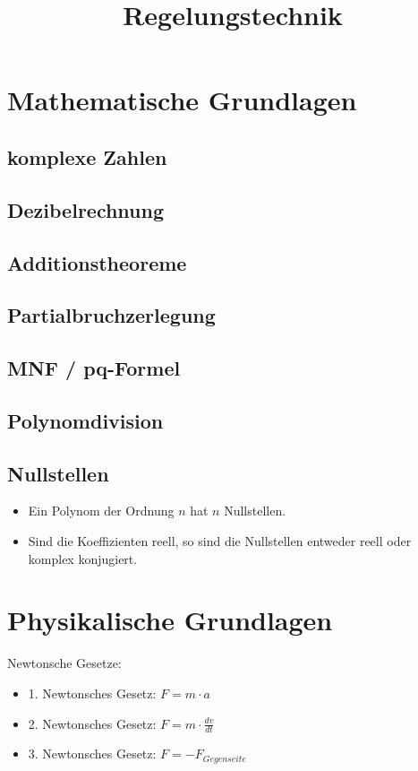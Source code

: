 \documentclass[german]{latex4ei/latex4ei_sheet}
\title{Regelungstechnik}
\begin{document}
\section{Mathematische Grundlagen}
\begin{sectionbox}
    \subsection{komplexe Zahlen}

    \subsection{Dezibelrechnung}

    \subsection{Additionstheoreme}


    \subsection{Partialbruchzerlegung}


    \subsection{MNF / pq-Formel}


    \subsection{Polynomdivision}

    \subsection{Nullstellen}
    \begin{itemize}
        \item Ein Polynom der Ordnung $n$ hat $n$ Nullstellen.
        \item Sind die Koeffizienten reell, so sind die Nullstellen entweder reell oder komplex konjugiert.
    \end{itemize}
    
\end{sectionbox}

\section{Physikalische Grundlagen}
\begin{sectionbox}
    Newtonsche Gesetze:
    \begin{itemize}
        \item 1. Newtonsches Gesetz: $F = m \cdot a$ \\
        \item 2. Newtonsches Gesetz: $F = m \cdot \frac{dv}{dt}$ \\
        \item 3. Newtonsches Gesetz: $F = -F_{Gegenseite}$ \\
    \end{itemize}
\end{sectionbox}
\end{document}
